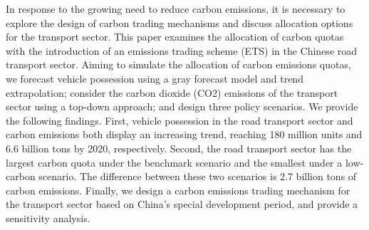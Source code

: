 In response to the growing need to reduce carbon emissions, it is necessary to explore the design of carbon trading mechanisms and discuss allocation options for the transport sector. This paper examines the allocation of carbon quotas with the introduction of an emissions trading scheme (ETS) in the Chinese road transport sector. Aiming to simulate the allocation of carbon emissions quotas, we forecast vehicle possession using a gray forecast model and trend extrapolation; consider the carbon dioxide (CO2) emissions of the transport sector using a top-down approach; and design three policy scenarios. We provide the following findings. First, vehicle possession in the road transport sector and carbon emissions both display an increasing trend, reaching 180 million units and 6.6 billion tons by 2020, respectively. Second, the road transport sector has the largest carbon quota under the benchmark scenario and the smallest under a low-carbon scenario. The difference between these two scenarios is 2.7 billion tons of carbon emissions. Finally, we design a carbon emissions trading mechanism for the transport sector based on China's special development period, and provide a sensitivity analysis.